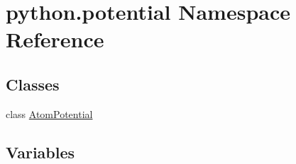 \hypertarget{namespacepython_1_1potential}{\section{python.\-potential Namespace Reference}
\label{namespacepython_1_1potential}
}
\subsection*{Classes}
\begin{DoxyCompactItemize}
\item 
class \hyperlink{classpython_1_1potential_1_1_atom_potential}{Atom\-Potential}
\end{DoxyCompactItemize}
\subsection*{Variables}
